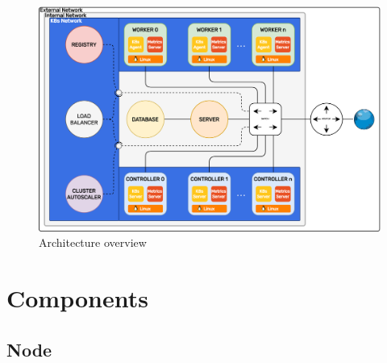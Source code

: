 \begin{figure}[htbp]
  \centering
  \includegraphics[width=.9\textwidth]{images/architecture/architecture.png}
  \caption{Architecture overview}
  \label{fig:architecture}
\end{figure}

\section{Components}
\label{sec:architecture_components}

\subsection{Node}
\label{subsec:architecture_components_node}


